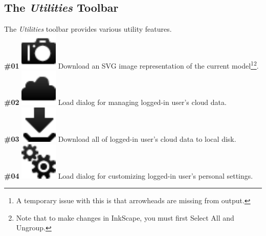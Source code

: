 \documentclass{article}
\numberwithin{equation}{section}
\numberwithin{figure}{section}
\begin{document}
\subsection{The \textit{Utilities} Toolbar} 
\label{ssec:utilitiestb}
The \textit{Utilities} toolbar provides various utility features.\\

\textbf{\#01} \hspace*{1cm}
\includegraphics[scale=0.5]{figures/icon_exportSVG} \hspace*{1cm}
Download an SVG image representation of the current model\footnote{A temporary issue with this is that arrowheads are missing from output.}\footnote{Note that to make changes in InkScape, you must first Select All and Ungroup.}.\\

\textbf{\#02} \hspace*{1cm}
\includegraphics[scale=0.5]{figures/icon_cloudmgmt} \hspace*{1cm}
Load dialog for managing logged-in user's cloud data.\\

\textbf{\#03} \hspace*{1cm}
\includegraphics[scale=0.5]{figures/icon_download} \hspace*{1cm}
Download all of logged-in user's cloud data to local disk.\\

\textbf{\#04} \hspace*{1cm}
\includegraphics[scale=0.5]{figures/icon_editprefs} \hspace*{1cm}
Load dialog for customizing logged-in user's personal settings.\\
\end{document}
